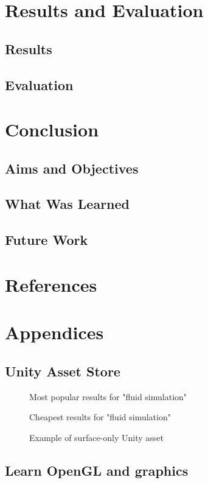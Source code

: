 \documentclass[12pt]{article}
\newcommand{\wideimage}[2][]{%
  \makebox[\textwidth][c]{\texttt{[image: \#2]}}%
}
\begin{document}
    

    \section{Results and Evaluation}
    \label{sec:resultsandevaluation}
    \subsection{Results}
    \subsection{Evaluation}

    \section{Conclusion}
    \label{sec:conclusion}
    \subsection{Aims and Objectives}
    \subsection{What Was Learned}
    \subsection{Future Work}

    \newpage
    \section{References}
    \label{sec:references}
    

    \newpage
    \section{Appendices}
    \label{sec:appendices}

    \subsection{Unity Asset Store}

    \begin{figure}[H]
        \wideimage[]{unityStore1.png}
        \caption{Most popular results for "fluid simulation" \cite{unityasset}}
    \end{figure}

    \begin{figure}[H]
        \wideimage[]{unityStore2.png}
        \caption{Cheapest results for "fluid simulation" \cite{unityasset}}
    \end{figure}

    \begin{figure}[H]
        \wideimage[]{stylizedWaterURP.png}
        \caption{Example of surface-only Unity asset \cite{stylized}}
    \end{figure}

    \subsection{Learn OpenGL and graphics}
\end{document}
